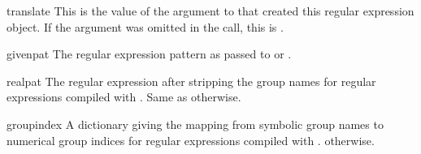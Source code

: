 \begin{datadesc}{translate}
This is the value of the  argument to
 that created this regular expression object.  If
the  argument was omitted in the 
call, this is .
\end{datadesc}

\begin{datadesc}{givenpat}
The regular expression pattern as passed to  or
.
\end{datadesc}

\begin{datadesc}{realpat}
The regular expression after stripping the group names for regular
expressions compiled with .  Same as 
otherwise.
\end{datadesc}

\begin{datadesc}{groupindex}
A dictionary giving the mapping from symbolic group names to numerical
group indices for regular expressions compiled with .
 otherwise.
\end{datadesc}
